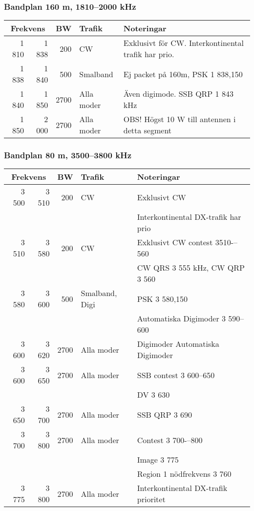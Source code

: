 \begin{landscape}
\subsubsection{Bandplan 160 m, 1810--2000 kHz}
\begin{tabular}{rrrll}
\multicolumn{2}{c}{\textbf{Frekvens}} & \textbf{BW} & \textbf{Trafik} & \textbf{Noteringar} \\ \hline
1 810 & 1 838 & 200  & CW         & Exklusivt för CW. Interkontinental trafik har prio. \\ \hline
1 838 & 1 840 & 500  & Smalband   & Ej packet på 160m, PSK 1 838,150                    \\ \hline
1 840 & 1 850 & 2700 & Alla moder & Även digimode. SSB QRP 1 843 kHz                    \\ \hline
1 850 & 2 000 & 2700 & Alla moder & OBS! Högst 10 W till antennen i detta segment       \\ \hline
\end{tabular}

\subsubsection{Bandplan 80 m, 3500--3800 kHz}
\begin{tabular}{rrrll}
\multicolumn{2}{c}{\textbf{Frekvens}} & \textbf{BW} & \textbf{Trafik} & \textbf{Noteringar} \\ \hline
3 500 & 3 510 & 200  & CW             & Exklusivt CW                         \\ 
      &       &      &                & Interkontinental DX-trafik har prio  \\ \hline
3 510 & 3 580 & 200  & CW             & Exklusivt CW contest 3510-–560       \\ 
      &       &      &                & CW QRS 3 555 kHz, CW QRP 3 560       \\ \hline
3 580 & 3 600 & 500  & Smalband, Digi & PSK 3 580,150                        \\
      &       &      &                & Automatiska Digimoder 3 590--600     \\ \hline
3 600 & 3 620 & 2700 & Alla moder     & Digimoder Automatiska Digimoder      \\ \hline
3 600 & 3 650 & 2700 & Alla moder     & SSB contest 3 600--650               \\
      &       &      &                & DV 3 630                             \\ \hline
3 650 & 3 700 & 2700 & Alla moder     & SSB QRP 3 690                        \\ \hline
3 700 & 3 800 & 2700 & Alla moder     & Contest 3 700-–800                   \\
      &       &      &                & Image 3 775                          \\
      &       &      &                & Region 1 nödfrekvens 3 760           \\ \hline
3 775 & 3 800 & 2700 & Alla moder     & Interkontinental DX-trafik prioritet \\ \hline
\end{tabular}


\end{landscape}
